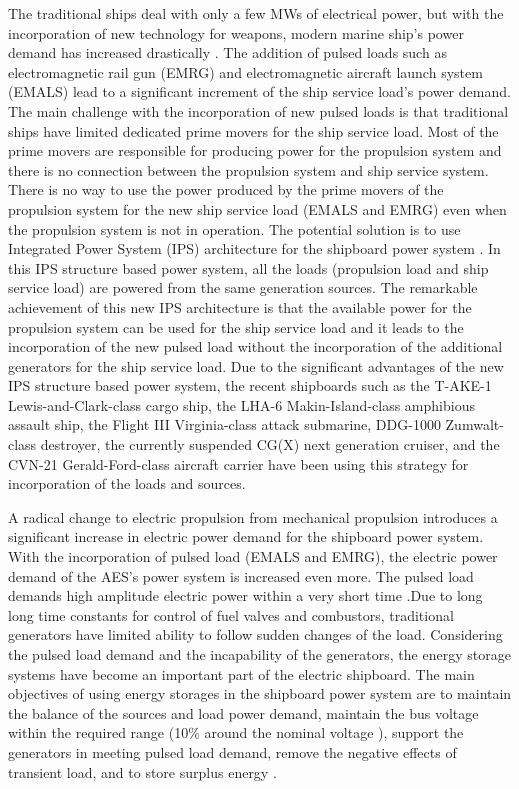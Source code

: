 The traditional ships deal with only a few MWs of electrical power, but with the incorporation of new technology for weapons, modern marine ship's power demand has increased drastically \cite{shen2012distributed}. The addition of pulsed loads such as electromagnetic rail gun (EMRG) and electromagnetic aircraft launch system (EMALS) lead to a significant increment of the ship service load's power demand. The main challenge with the incorporation of new pulsed loads is that traditional ships have limited dedicated prime movers for the ship service load. Most of the prime movers are responsible for producing power for the propulsion system and there is no connection between the propulsion system and ship service system. There is no way to use the power produced by the prime movers of the propulsion system for the new ship service load (EMALS and EMRG) even when the propulsion system is not in operation. The potential solution is to use  Integrated Power System (IPS) architecture for the shipboard power system \cite{shen2012distributed}. In this IPS structure based power system, all the loads (propulsion load and ship service load) are powered from the same generation sources. The remarkable achievement of this new IPS architecture is that the available power for the propulsion system can be used for the ship service load and it leads to the incorporation of the new pulsed load without the incorporation of the additional generators for the ship service load. Due to the significant advantages of the new IPS structure  based power system, the recent shipboards  such as the T-AKE-1 Lewis-and-Clark-class cargo ship, the LHA-6 Makin-Island-class amphibious assault ship, the Flight III Virginia-class attack submarine,  DDG-1000 Zumwalt-class destroyer, the currently suspended CG(X) next generation cruiser, and the CVN-21 Gerald-Ford-class aircraft carrier \cite{doerry2009next, pifer2010modeling} have been using this strategy for incorporation of the loads and sources.


A radical change to electric propulsion from mechanical propulsion introduces a significant increase in electric power demand for the shipboard power system. With the incorporation of pulsed load (EMALS and EMRG), the electric power demand of the AES's power system is increased even more. The pulsed load demands high amplitude electric power within a very short time \cite{monti2008energy}.Due to long long time constants for control of fuel valves and combustors, traditional generators have limited ability to follow sudden changes of the load. Considering the pulsed load demand and the incapability of the generators, the energy storage systems have become an important part of the electric shipboard. The main objectives of using energy storages in the shipboard power system are to maintain the balance of the sources and load power demand, maintain the bus voltage within the required range (10\% around the nominal voltage \cite{mystandard}), support the generators in meeting pulsed load demand, remove the negative effects of transient load, and to store surplus energy \cite{yfuzzy2016, mskhanhybrid2016, khan2017fuzzy, mskhanests2017}. 



